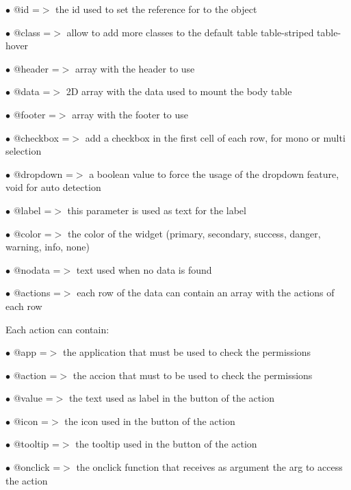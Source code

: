 \documentclass[a4paper]{article}
\begin{document}
\begin{compactitem}
\item[\color{myblue}$\bullet$] @id       =$>$ the id used to set the reference for to the object
\item[\color{myblue}$\bullet$] @class    =$>$ allow to add more classes to the default table table-striped table-hover
\item[\color{myblue}$\bullet$] @header   =$>$ array with the header to use
\item[\color{myblue}$\bullet$] @data     =$>$ 2D array with the data used to mount the body table
\item[\color{myblue}$\bullet$] @footer   =$>$ array with the footer to use
\item[\color{myblue}$\bullet$] @checkbox =$>$ add a checkbox in the first cell of each row, for mono or multi selection
\item[\color{myblue}$\bullet$] @dropdown =$>$ a boolean value to force the usage of the dropdown feature, void for auto detection
\item[\color{myblue}$\bullet$] @label    =$>$ this parameter is used as text for the label
\item[\color{myblue}$\bullet$] @color    =$>$ the color of the widget (primary, secondary, success, danger, warning, info, none)
\item[\color{myblue}$\bullet$] @nodata   =$>$ text used when no data is found
\item[\color{myblue}$\bullet$] @actions  =$>$ each row of the data can contain an array with the actions of each row
\end{compactitem}

Each action can contain:

\begin{compactitem}
\item[\color{myblue}$\bullet$] @app     =$>$ the application that must be used to check the permissions
\item[\color{myblue}$\bullet$] @action  =$>$ the accion that must to be used to check the permissions
\item[\color{myblue}$\bullet$] @value   =$>$ the text used as label in the button of the action
\item[\color{myblue}$\bullet$] @icon    =$>$ the icon used in the button of the action
\item[\color{myblue}$\bullet$] @tooltip =$>$ the tooltip used in the button of the action
\item[\color{myblue}$\bullet$] @onclick =$>$ the onclick function that receives as argument the arg to access the action
\end{compactitem}
\end{document}
